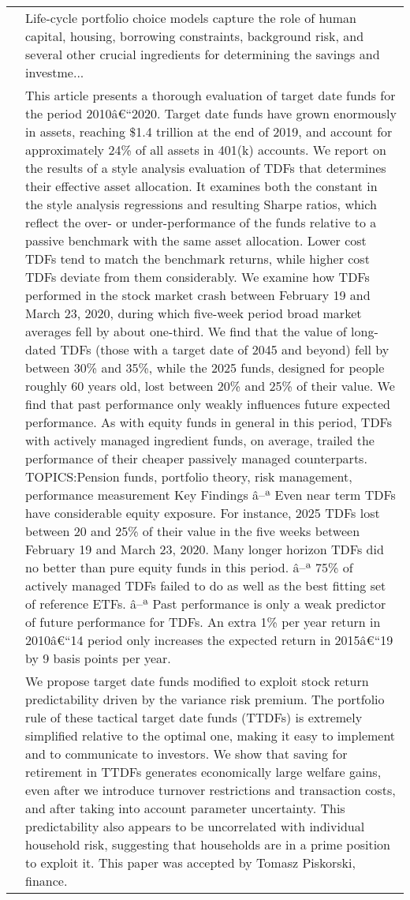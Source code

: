 \documentclass{article}
\begin{document}
\begin{tabular}{p{}p{}}
\cite{Gomes_2020} & Life-cycle portfolio choice models capture the role of human capital, housing, borrowing constraints, background risk, and several other crucial ingredients for determining the savings and investme... \\
\cite{Shoven_2021} & This article presents a thorough evaluation of target date funds for the period 2010â€``2020. Target date funds have grown enormously in assets, reaching \$1.4 trillion at the end of 2019, and account for approximately 24\% of all assets in 401(k) accounts. We report on the results of a style analysis evaluation of TDFs that determines their effective asset allocation. It examines both the constant in the style analysis regressions and resulting Sharpe ratios, which reflect the over- or under-performance of the funds relative to a passive benchmark with the same asset allocation. Lower cost TDFs tend to match the benchmark returns, while higher cost TDFs deviate from them considerably. We examine how TDFs performed in the stock market crash between February 19 and March 23, 2020, during which five-week period broad market averages fell by about one-third. We find that the value of long-dated TDFs (those with a target date of 2045 and beyond) fell by between 30\% and 35\%, while the 2025 funds, designed for people roughly 60 years old, lost between 20\% and 25\% of their value. We find that past performance only weakly influences future expected performance. As with equity funds in general in this period, TDFs with actively managed ingredient funds, on average, trailed the performance of their cheaper passively managed counterparts.  TOPICS:Pension funds, portfolio theory, risk management, performance measurement  Key Findings  â--ª Even near term TDFs have considerable equity exposure. For instance, 2025 TDFs lost between 20 and 25\% of their value in the five weeks between February 19 and March 23, 2020. Many longer horizon TDFs did no better than pure equity funds in this period.  â--ª 75\% of actively managed TDFs failed to do as well as the best fitting set of reference ETFs.  â--ª Past performance is only a weak predictor of future performance for TDFs. An extra 1\% per year return in 2010â€``14 period only increases the expected return in 2015â€``19 by 9 basis points per year. \\
\cite{Gomes_2022} & We propose target date funds modified to exploit stock return predictability driven by the variance risk premium. The portfolio rule of these tactical target date funds (TTDFs) is extremely simplified relative to the optimal one, making it easy to implement and to communicate to investors. We show that saving for retirement in TTDFs generates economically large welfare gains, even after we introduce turnover restrictions and transaction costs, and after taking into account parameter uncertainty. This predictability also appears to be uncorrelated with individual household risk, suggesting that households are in a prime position to exploit it. This paper was accepted by Tomasz Piskorski, finance. \\

\end{tabular}
\end{document}
